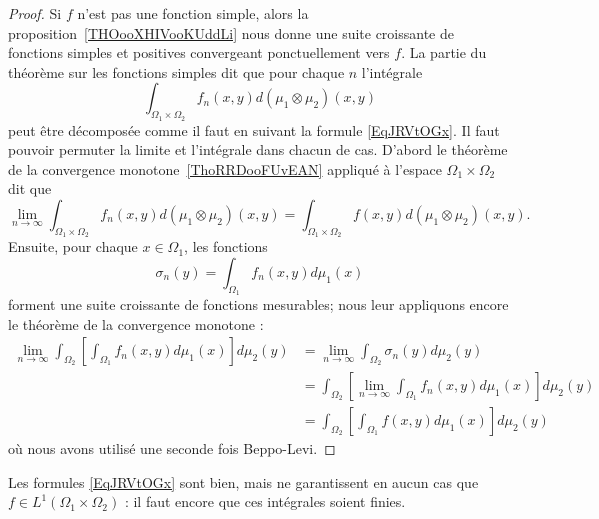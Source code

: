 \begin{proof}
	Si \( f\) n'est pas une fonction simple, alors la proposition~\ref{THOooXHIVooKUddLi} nous donne une suite croissante de fonctions simples et positives convergeant ponctuellement vers \( f\). La partie du théorème sur les fonctions simples dit que pour chaque \( n\) l'intégrale
	\begin{equation}
		\int_{\Omega_1\times \Omega_2}f_n(x,y)d(\mu_1\otimes\mu_2)(x,y)
	\end{equation}
	peut être décomposée comme il faut en suivant la formule \eqref{EqJRVtOGx}. Il faut pouvoir permuter la limite et l'intégrale dans chacun de cas. D'abord le théorème de la convergence monotone~\ref{ThoRRDooFUvEAN} appliqué à l'espace \( \Omega_1\times \Omega_2\) dit que
	\begin{equation}
		\lim_{n\to \infty} \int_{\Omega_1\times \Omega_2}f_n(x,y)d(\mu_1\otimes \mu_2)(x,y)= \int_{\Omega_1\times \Omega_2}f(x,y)d(\mu_1\otimes \mu_2)(x,y).
	\end{equation}
	Ensuite, pour chaque \( x\in\Omega_1\), les fonctions
	\begin{equation}
		\sigma_n(y)=\int_{\Omega_1}f_n(x,y)d\mu_1(x)
	\end{equation}
	forment une suite croissante de fonctions mesurables; nous leur appliquons encore le théorème de la convergence monotone :
	\begin{subequations}
		\begin{align}
			\lim_{n\to \infty} \int_{\Omega_2}\left[ \int_{\Omega_1}f_n(x,y)d\mu_1(x) \right]d\mu_2(y) & =\lim_{n\to \infty} \int_{\Omega_2}\sigma_n(y)d\mu_2(y)                                   \\
			                                                                                           & =\int_{\Omega_2}\left[\lim_{n\to \infty} \int_{\Omega_1}f_n(x,y)d\mu_1(x)\right]d\mu_2(y) \\
			                                                                                           & =\int_{\Omega_2}\left[ \int_{\Omega_1}f(x,y)d\mu_1(x) \right]d\mu_2(y)
		\end{align}
	\end{subequations}
	où nous avons utilisé une seconde fois Beppo-Levi.
\end{proof}

\begin{remark}
	Les formules \eqref{EqJRVtOGx} sont bien, mais ne garantissent en aucun cas que \( f\in L^1(\Omega_1\times \Omega_2)\) : il faut encore que ces intégrales soient finies.
\end{remark}

